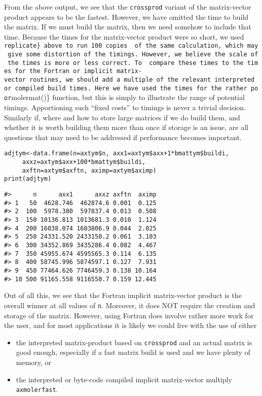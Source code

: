 From the above output, we see that the \texttt{crossprod} variant of the
matrix-vector product appears to be the fastest. However, we have omitted
the time to build the matrix. If we must build the matrix, then we need
somehow to include that time. Because the times for the matrix-vector
product were so short, we used \texttt{replicate\}\ above\ to\ run\ 100\ copies\ \ of\ the\ same\ calculation,\ which\ may\ give\ some\ distortion\ of\ the\ timings.\ However,\ we\ believe\ the\ scale\ of\ the\ times\ is\ more\ or\ less\ correct.\ To\ \ compare\ these\ times\ to\ the\ times\ for\ the\ Fortran\ or\ implicit\ matrix-vector\ routines,\ we\ should\ add\ a\ multiple\ of\ the\ relevant\ interpreted\ or\ compiled\ build\ times.\ Here\ we\ have\ used\ the\ times\ for\ the\ rather\ poor}molermat()\} function, but this is simply to illustrate the range
of potential timings. Apportioning such ``fixed costs'' to timings is
never a trivial decision. Similarly if, where and how to store
large matrices if we do build them, and whether it is worth building
them more than once if storage is an issue, are all questions that
may need to be addressed if performance becomes important.

\begin{verbatim}
adjtym<-data.frame(n=axtym$n, axx1=axtym$axx+1*bmattym$buildi, 
     axxz=axtym$axx+100*bmattym$buildi, 
     axftn=axtym$axftn, aximp=axtym$aximp)
print(adjtym)
\end{verbatim}

\begin{verbatim}
#>      n      axx1      axxz axftn  aximp
#> 1   50  4628.746  462874.6 0.001  0.125
#> 2  100  5978.380  597837.4 0.013  0.508
#> 3  150 10136.813 1013681.3 0.010  1.124
#> 4  200 16038.074 1603806.9 0.044  2.025
#> 5  250 24331.520 2433150.2 0.061  3.103
#> 6  300 34352.869 3435286.4 0.082  4.467
#> 7  350 45955.674 4595565.3 0.114  6.135
#> 8  400 58745.996 5874597.1 0.127  7.931
#> 9  450 77464.626 7746459.3 0.138 10.164
#> 10 500 91165.558 9116550.7 0.159 12.445
\end{verbatim}

Out of all this, we see that the Fortran implicit matrix-vector product is
the overall winner at all values of \texttt{n}. Moreover, it does NOT
require the creation and storage of the matrix. However, using Fortran
does involve rather more work for the user, and for most applications
it is likely we could live with the use of either

\begin{itemize}
\tightlist
\item
  the interpreted matrix-product based on \texttt{crossprod}
  and an actual matrix is good enough, especially if a fast
  matrix build is used and we have plenty of memory, or
\item
  the interpreted or byte-code compiled implicit matrix-vector
  multiply \texttt{axmolerfast}.
\end{itemize}

